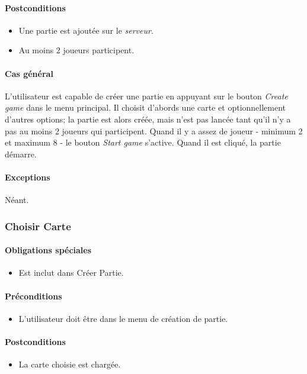 \documentclass[a4paper,11pt]{report}
\begin{document}
\paragraph{Postconditions}
\begin{itemize}
 \item Une partie est ajoutée sur le \textit{serveur}.
 \item Au moins 2 joueurs participent.
\end{itemize}
\paragraph{Cas général}
L'utilisateur est capable de créer une partie en appuyant sur le bouton \og \textit{Create game} \fg dans le menu principal.
Il choisit d'abords une carte et optionnellement d'autres options; la partie est alors créée, mais n'est pas lancée tant qu'il n'y a pas au moins 2 joueurs qui participent.
Quand il y a assez de joueur - minimum 2 et maximum 8 - le bouton \og \textit{Start game} \fg s'active. Quand il est cliqué, la partie démarre.
\paragraph{Exceptions} Néant.

\newpage
\subsubsection{Choisir Carte}
\paragraph{Obligations spéciales}
\begin{itemize}
 \item Est inclut dans Créer Partie.
\end{itemize}
\paragraph{Préconditions}
\begin{itemize}
 \item L'utilisateur doit être dans le menu de création de partie.
\end{itemize}
\paragraph{Postconditions}
\begin{itemize}
 \item La carte choisie est chargée.
\end{itemize}
\end{document}
